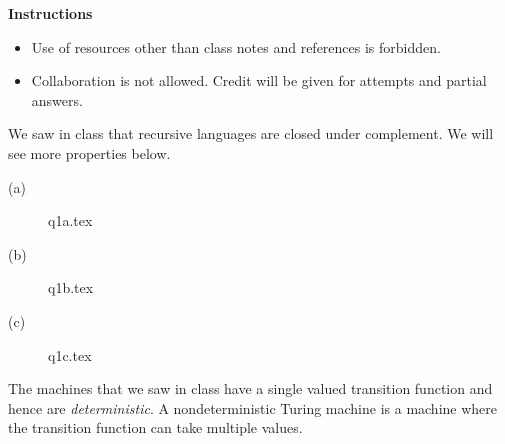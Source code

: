 \documentclass[11pt, a4paper,answers]{exam}
\begin{document}
	\textbf{Instructions}
	\begin{itemize}   \setlength\itemsep{0.1mm}
		\item {\sf  Use of resources other than class notes and references is forbidden.}
		\item {\sf Collaboration is not allowed. Credit will be given for attempts and partial answers.}
	\end{itemize}

\begin{questions}
	

 We saw in class that recursive languages are closed under complement. We will see more properties below.

\begin{solution}
	\begin{description}
		\item[(a)] {q1a.tex}
		\item[(b)] {q1b.tex}
		\item[(c)] {q1c.tex}
	\end{description}
\end{solution}


 The machines that we saw in class have a single valued transition function and hence are \textit{deterministic}. A nondeterministic Turing machine is a machine where the transition function can take multiple values.
\begin{parts}

\end{parts}
\end{questions}
\end{document}
